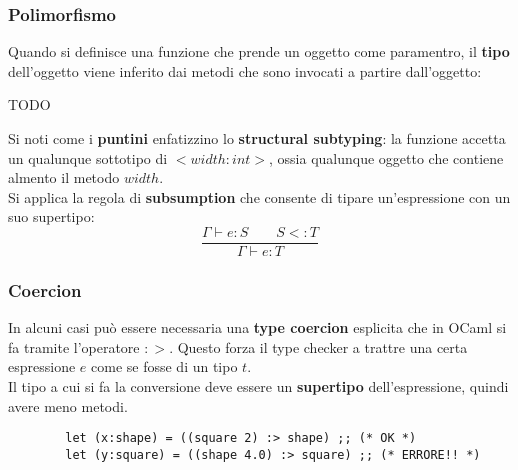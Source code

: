 \subsubsection{Polimorfismo}
Quando si definisce una funzione che prende un oggetto come paramentro, il \textbf{tipo} dell'oggetto viene inferito dai metodi che sono invocati a partire dall'oggetto:
\begin{example}
	TODO
\end{example}
Si noti come i \textbf{puntini} enfatizzino lo \textbf{structural subtyping}: la funzione accetta un qualunque sottotipo di $<width:int>$, ossia qualunque oggetto che contiene almento il metodo $width$.\\
Si applica la regola di \textbf{subsumption} che consente di tipare un'espressione con un suo supertipo:
\begin{equation*}
	\frac{\Gamma \vdash e: S \qquad S <: T}{\Gamma \vdash e:T}
\end{equation*}

\subsubsection{Coercion}
In alcuni casi può essere necessaria una \textbf{type coercion} esplicita che in OCaml si fa tramite l'operatore $:>$. Questo forza il type checker a trattre una certa espressione $e$ come se fosse di un tipo $t$.\\
Il tipo a cui si fa la conversione deve essere un \textbf{supertipo} dell'espressione, quindi avere meno metodi.
\begin{example}
	\begin{lstlisting}
		let (x:shape) = ((square 2) :> shape) ;; (* OK *)
		let (y:square) = ((shape 4.0) :> square) ;; (* ERRORE!! *)
	\end{lstlisting}
\end{example}

